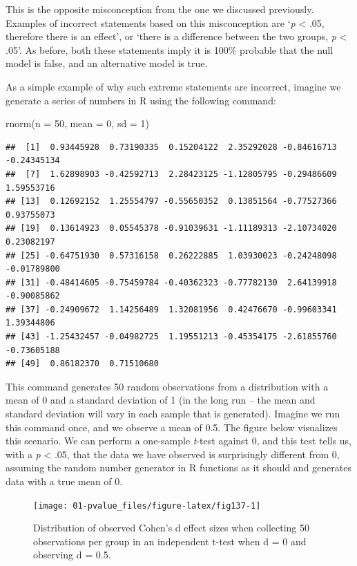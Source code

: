 \documentclass[
]{krantz}
\newenvironment{Shaded}{\begin{snugshade}}{\end{snugshade}}
\newcommand{\AttributeTok}[1]{\textcolor[rgb]{0.77,0.63,0.00}{#1}}
\newcommand{\DecValTok}[1]{\textcolor[rgb]{0.00,0.00,0.81}{#1}}
\newcommand{\FunctionTok}[1]{\textcolor[rgb]{0.00,0.00,0.00}{#1}}
\newcommand{\NormalTok}[1]{#1}
\begin{document}
This is the opposite misconception from the one we discussed previously. Examples of incorrect statements based on this misconception are `\emph{p} \textless{} .05, therefore there is an effect', or `there is a difference between the two groups, \emph{p} \textless{} .05'. As before, both these statements imply it is 100\% probable that the null model is false, and an alternative model is true.

As a simple example of why such extreme statements are incorrect, imagine we generate a series of numbers in R using the following command:

\begin{Shaded}
\begin{Highlighting}[]
\FunctionTok{rnorm}\NormalTok{(}\AttributeTok{n =} \DecValTok{50}\NormalTok{, }\AttributeTok{mean =} \DecValTok{0}\NormalTok{, }\AttributeTok{sd =} \DecValTok{1}\NormalTok{)}
\end{Highlighting}
\end{Shaded}

\begin{verbatim}
##  [1]  0.93445928  0.73190335  0.15204122  2.35292028 -0.84616713 -0.24345134
##  [7]  1.62898903 -0.42592713  2.28423125 -1.12805795 -0.29486609  1.59553716
## [13]  0.12692152  1.25554797 -0.55650352  0.13851564 -0.77527366  0.93755073
## [19]  0.13614923  0.05545378 -0.91039631 -1.11189313 -2.10734020  0.23082197
## [25] -0.64751930  0.57316158  0.26222885  1.03930023 -0.24248098 -0.01789800
## [31] -0.48414605 -0.75459784 -0.40362323 -0.77782130  2.64139918 -0.90085862
## [37] -0.24909672  1.14256489  1.32081956  0.42476670 -0.99603341  1.39344806
## [43] -1.25432457 -0.04982725  1.19551213 -0.45354175 -2.61855760 -0.73605188
## [49]  0.86182370  0.71510680
\end{verbatim}

This command generates 50 random observations from a distribution with a mean of 0 and a standard deviation of 1 (in the long run -- the mean and standard deviation will vary in each sample that is generated). Imagine we run this command once, and we observe a mean of 0.5. The figure below visualizes this scenario. We can perform a one-sample \emph{t}-test against 0, and this test tells us, with a \emph{p} \textless{} .05, that the data we have observed is surprisingly different from 0, assuming the random number generator in R functions as it should and generates data with a true mean of 0.

\begin{figure}

{\centering \texttt{[image: 01-pvalue\_files/figure-latex/fig137-1]} 

}

\caption{Distribution of observed Cohen's d effect sizes when collecting 50 observations per group in an independent t-test when d = 0 and observing d = 0.5.}\label{fig:fig137}
\end{figure}
\end{document}
